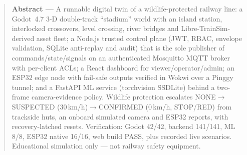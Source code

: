 \documentclass[10pt,a4paper,twocolumn]{article}
\begin{document}

\begin{abstract}
\noindent\textbf{Abstract ---} A runnable digital twin of a wildlife-protected railway line: a Godot~4.7 3-D double-track ``stadium'' world with an island station, interlocked crossovers, level crossing, river bridges and Libre-TrainSim-derived asset fleet; a Node.js trusted control plane (JWT, RBAC, envelope validation, SQLite anti-replay and audit) that is the sole publisher of commands/state/signals on an authenticated Mosquitto MQTT broker with per-client ACLs; a React dashboard for viewer/operator/admin; an ESP32 edge node with fail-safe outputs verified in Wokwi over a Pinggy tunnel; and a FastAPI ML service (torchvision SSDLite) behind a two-frame camera-evidence policy. Wildlife protection escalates NONE$\rightarrow$SUSPECTED (30\,km/h)$\rightarrow$CONFIRMED (0\,km/h, STOP/RED) from trackside huts, an onboard simulated camera and ESP32 reports, with recovery-latched resets. Verification: Godot 42/42, backend 141/141, ML 8/8, ESP32 native 16/16, web build PASS, plus recorded live scenarios. Educational simulation only --- not railway safety equipment.
\end{abstract}
\end{document}
